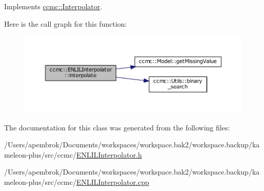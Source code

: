 Implements \hyperlink{classccmc_1_1_interpolator_aa6b272bd53630020d92938ec1e5cfad9}{ccmc\-::\-Interpolator}.



Here is the call graph for this function\-:\nopagebreak
\begin{figure}[H]
\begin{center}
\leavevmode
\includegraphics[width=350pt]{classccmc_1_1_e_n_l_i_l_interpolator_a92508c6305deec651299b7e70ee3c531_cgraph}
\end{center}
\end{figure}




The documentation for this class was generated from the following files\-:\begin{DoxyCompactItemize}
\item 
/\-Users/apembrok/\-Documents/workspaces/workspace.\-bak2/workspace.\-backup/kameleon-\/plus/src/ccmc/\hyperlink{_e_n_l_i_l_interpolator_8h}{E\-N\-L\-I\-L\-Interpolator.\-h}\item 
/\-Users/apembrok/\-Documents/workspaces/workspace.\-bak2/workspace.\-backup/kameleon-\/plus/src/ccmc/\hyperlink{_e_n_l_i_l_interpolator_8cpp}{E\-N\-L\-I\-L\-Interpolator.\-cpp}\end{DoxyCompactItemize}
